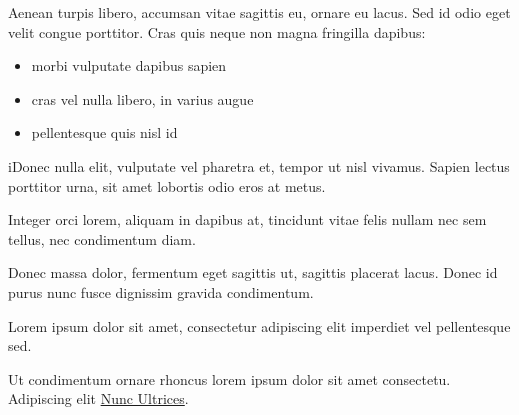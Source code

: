 \documentclass[10pt]{article} %
\begin{document}
\begin{minipage}[t]{.66\linewidth}

\hypertarget{secondnews}{} %

Aenean turpis libero, accumsan vitae sagittis eu, ornare eu lacus. Sed id odio
eget velit congue porttitor. Cras quis neque non magna fringilla dapibus:

\begin{itemize}
\item morbi vulputate dapibus sapien
\item cras vel nulla libero, in varius augue
\item pellentesque quis nisl id
\end{itemize}

iDonec nulla elit, vulputate vel pharetra et, tempor ut nisl vivamus. Sapien
lectus porttitor urna, sit amet lobortis odio eros at metus.

Integer orci lorem, aliquam in dapibus at, tincidunt vitae felis nullam nec sem
tellus, nec condimentum diam.

Donec massa dolor, fermentum eget sagittis ut, sagittis placerat lacus. Donec id
purus nunc fusce dignissim gravida condimentum.

Lorem ipsum dolor sit amet, consectetur adipiscing elit imperdiet vel
pellentesque sed.

Ut condimentum ornare rhoncus lorem ipsum dolor sit amet consectetu. Adipiscing
elit \href{http://www.example.com}{Nunc Ultrices}.

\end{minipage} %

\end{document}
